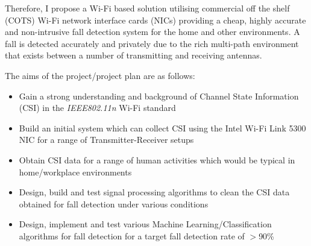 Therefore, I propose a Wi-Fi based solution utilising commercial off the shelf (COTS) Wi-Fi network interface cards (NICs) providing a cheap, highly accurate and non-intrusive fall detection system for the home and other environments. A fall is detected accurately and privately due to the rich multi-path environment that exists between a number of transmitting and receiving antennas. \par
\begin{comment}Previous research papers have explored the use of the Channel State Information (CSI) of a WLAN Channel for fall detection.\end{comment} 
The aims of the project/project plan are as follows: 
\vspace{-11pt}
\begin{itemize}[noitemsep, topsep=0pt]
\item Gain a strong understanding and background of Channel State Information (CSI) in the \textit{IEEE802.11n} Wi-Fi standard 
\item Build an initial system which can collect CSI using the Intel Wi-Fi Link 5300 NIC for a range of Transmitter-Receiver setups
\item Obtain CSI data for a range of human activities which would be typical in home/workplace environments
\item Design, build and test signal processing algorithms to clean the CSI data obtained for fall detection under various conditions
\item Design, implement and test various Machine Learning/Classification algorithms for fall detection for a target fall detection rate of $>$90\%
\end{itemize}

